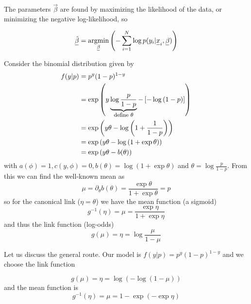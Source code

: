The parameters $\vec{\beta}$ are found by maximizing the likelihood of the data,
or minimizing the negative log-likelihood, so

\begin{equation}
    \vec{\hat{\beta}} = \argmin_{\vec{\beta}} \left( - \sum_{i=1}^N \log{p(y_i | \vec{x}_i, \vec{\beta})} \right)
\end{equation}

Consider the binomial distribution given by
\begin{equation}
    \begin{aligned}
        f(y|p) &= p^y(1-p)^{1-y} \\
               &= \exp{\left( y \explain{\log{\frac{p}{1-p}}}{define $\theta$} - \left[ - \log{(1-p)} \right] \right)} \\
               &= \exp{\left( y \theta - \log{\left(1 + \frac{1}{1-p}\right)} \right)} \\
               &= \exp{\left( y \theta - \log{\left(1 + \exp{\theta}\right)} \right)} \\
               &= \exp{\left( y \theta - b(\theta) \right)}
    \end{aligned}
\end{equation}
with $a(\phi) = 1, c(y,\phi) = 0, b(\theta) = \log{\left(1 + \exp{\theta}\right)}$ and $\theta = \log{\frac{p}{1-p}}$. From this we can find the well-known mean as
\begin{equation}
    \mu = \partial_{\theta} b(\theta) = \frac{\exp{\theta}}{1 + \exp{\theta}} = p
\end{equation}
so for the canonical link ($\eta = \theta$) we have the mean function (a sigmoid)
\begin{equation}
    g^{-1}(\eta) = \mu = \frac{\exp{\eta}}{1 + \exp{\eta}}
\end{equation}
and thus the link function (log-odds)
\begin{equation}
    g(\mu) = \eta = \log{\frac{\mu}{1-\mu}}
\end{equation}

Let us discuss the general route. Our model is $f(y|p) = p^y (1-p)^{1-y}$ and we choose the link function

\begin{equation}
    g(\mu) = \eta = \log{\left( - \log{(1-\mu)} \right)}
\end{equation}
and the mean function is
\begin{equation}
    g^{-1}(\eta) = \mu = 1 - \exp{\left( - \exp{\eta} \right)}
\end{equation}

